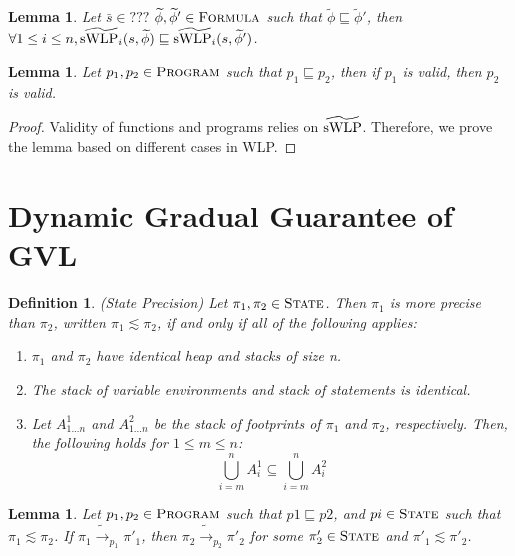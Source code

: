 \documentclass {article}
\newtheorem{lemma}[theorem]{Lemma}
\newtheorem{definition}[theorem]{Definition}
\newcommand{\tphi}{\widetilde{\phi}}
\newcommand{\tswlpi}[2]{\widetilde{\textup{sWLP}_i}(#1,#2)}
\begin{document}
\begin{lemma}
\label{lemma_swlp_precision}
Let $\bar{s} \in ???$ $\tphi, \tphi' \in \textsc{Formula}$ such that $\tphi \sqsubseteq \tphi'$, then $\forall 1 \leq i \leq n, \tswlpi{s}{\tphi} \sqsubseteq \tswlpi{s}{\tphi'}$.
\end{lemma}

\begin{lemma}
Let $p_1, p_2 \in \textsc{Program}$ such that $p_1 \sqsubseteq p_2$, then if $p_1$ is valid, then $p_2$ is valid.
\end{lemma}
\begin{proof}
Validity of functions and programs relies on $\widetilde{\textup{sWLP}}$. Therefore, we prove the lemma based on different cases in WLP.
\end{proof}

\section{Dynamic Gradual Guarantee of GVL}
\begin{definition} (State Precision)
Let $\pi_1, \pi_2 \in \textsc{State}$. Then $\pi_1$ is more precise than $\pi_2$, written $\pi_1 \lesssim \pi_2$, if and only if all of the following applies:
\begin{enumerate}
	\item $\pi_1$ and $\pi_2$ have identical heap and stacks of size n.
	\item The stack of variable environments and stack of statements is identical.
	\item Let $A^1_{1...n}$ and $A^2_{1...n}$ be the stack of footprints of $\pi_1$ and $\pi_2$, respectively. Then, the following holds for $1 \leq m \leq n$: $$\bigcup_{i = m}^n A^1_i \subseteq \bigcup_{i=m}^n A^2_i$$
\end{enumerate}
\end{definition}
\begin{lemma} 
Let $p_1, p_2 \in \textsc{Program}$ such that $p1 \sqsubseteq p2$, and $pi \in \textsc{State}$ such that $\pi_1 \lesssim \pi_2$. If $\pi_1 \widetilde{\rightarrow}_{p_1} \pi'_1$, then $\pi_2 \widetilde{\rightarrow}_{p_2} \pi'_2$ for some $\pi'_2 \in \textsc{State}$ and $\pi'_1 \lesssim \pi'_2$.
\end{lemma}
\end{document}
